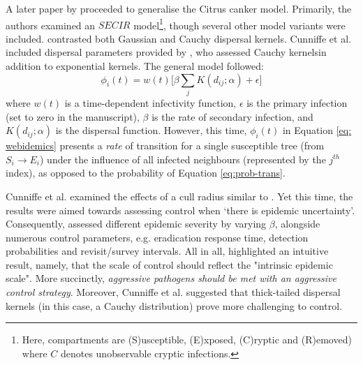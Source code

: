 A later paper by \cite{WEBIDEMICS} proceeded to generalise the Citrus canker model.
Primarily, the authors examined an $SECIR$ model\footnote{
Here, compartments are (S)usceptible, (E)xposed, (C)ryptic and (R)emoved) where $C$ 
denotes unobservable cryptic infections.}, though several other model variants were included. 
\cite{WEBIDEMICS} contrasted both Gaussian and Cauchy dispersal kernels.
Cunniffe et al. included dispersal parameters provided by \cite{neri2014bayesian}, who
assessed Cauchy kernels\textemdash in addition to exponential kernels.
The general model followed:
\begin{equation}
\label{eq: webidemics}
     \phi_i(t) = w(t)\big[\beta \sum_j K(d_{ij}; \alpha) + \epsilon \big]
\end{equation}
where $w(t)$ is a time-dependent infectivity function, $\epsilon$ is the primary infection 
(set to zero in the manuscript), $\beta$ is the rate of secondary infection, and $K(d_{ij}; \alpha)$
is the dispersal function. However, this time, $\phi_i(t)$ in Equation \ref{eq: webidemics} presents a \textit{rate} of transition for a single susceptible tree (from $S_i \rightarrow E_i$) under the influence of all infected neighbours (represented by the $j^{th}$ index), as opposed to the probability of Equation \ref{eq:prob-trans}.

Cunniffe et al. examined the effects of a cull radius similar to \cite{parnell2010effect}. 
Yet this time, the results were aimed towards assessing control when `there is epidemic uncertainty'.
Consequently, \cite{WEBIDEMICS} assessed different epidemic severity by varying $\beta$, alongside
numerous control parameters, e.g. eradication response time, detection probabilities and revisit/survey intervals. 
All in all, \cite{WEBIDEMICS} highlighted an intuitive result, namely, that the scale of control should
reflect the "intrinsic epidemic scale". More succinctly, \textit{aggressive pathogens should be met with 
an aggressive control strategy}. Moreover, Cunniffe et al. suggested that thick-tailed dispersal kernels
(in this case, a Cauchy distribution) prove more challenging to control.

